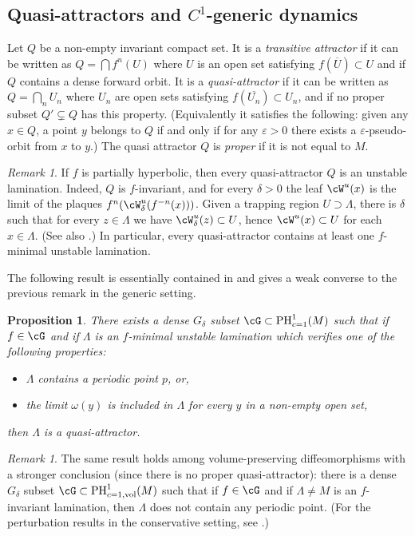 \documentclass[a4paper,11pt]{amsart}
\numberwithin{equation}{section}     %
\newtheorem{prop}[teo]{Proposition}
\theoremstyle{definition}
\theoremstyle{remark}
\newtheorem{obs}[teo]{Remark}
\begin{document}
\subsection{Quasi-attractors and $C^1$-generic dynamics}\label{ss.prelimgeneric}
Let $Q$ be a non-empty invariant compact set.
It is a \emph{transitive attractor} if it can be written as $Q= \bigcap f^n(U)$ where $U$ is an open set satisfying
$f(\overline U)\subset U$ and if $Q$ contains a dense forward orbit.
It is a \emph{quasi-attractor} if it can be written as
$Q= \bigcap_n U_n$ where $U_n$ are open sets satisfying $f(\overline{U_n}) \subset U_n$,
and if no proper subset $Q'\subsetneq Q$ has this property. (Equivalently it satisfies the following: given any $x\in Q$, a point $y$ belongs to $Q$ if and only if for any $\varepsilon>0$ there exists a $\varepsilon$-pseudo-orbit from $x$ to $y$.) The quasi attractor $Q$ is \emph{proper} if it is not equal to $M$.

\begin{obs} If $f$ is partially hyperbolic, then every quasi-attractor $Q$
is an unstable lamination.
Indeed, $Q$ is $f$-invariant, and for every $\delta>0$ the leaf $\cW^u(x)$ is the limit of the plaques $f^n(\cW^u_{\delta}(f^{-n}(x)))$. Given a trapping region $U \supset \Lambda$,
there is $\delta$ such that for every $z \in \Lambda$ we have $\cW^u_\delta(z) \subset U$, hence $\cW^u(x)\subset U$ for each $x\in \Lambda$. (See also \cite[Lemme 5.2]{BC-rec}.) In particular, every quasi-attractor contains at least one $f$-minimal unstable lamination. 
\end{obs}

The following result is essentially contained in \cite[\S{5}]{BC-rec} and gives a weak converse to the previous remark in the generic setting.

\begin{prop}\label{prop-QAgeneric}
There exists a dense $G_\delta$ subset $\cG \subset \mathrm{PH}^1_{c=1}(M)$ such that if $f \in \cG$ and if $\Lambda$ is an $f$-minimal unstable lamination which verifies one of the following properties:
\begin{itemize}
\item $\Lambda$ contains a periodic point $p$, or, 
\item the limit $\omega(y)$ is included in $\Lambda$ for every $y$ in a non-empty open set,
\end{itemize} \noindent then $\Lambda$ is a quasi-attractor.
\end{prop}
\begin{obs}
The same result holds among volume-preserving diffeomorphisms with a stronger conclusion (since there is no proper quasi-attractor): there is a dense $G_\delta$ subset $\cG \subset \mathrm{PH}^1_{c=1, \mathrm{vol}}(M)$ such that if $f \in \cG$ and if $\Lambda\neq M$ is an $f$-invariant lamination, then $\Lambda$ does not contain any periodic point. (For the perturbation results in the conservative setting, see \cite[\S 6]{BC-rec}.) 
\end{obs}
\end{document}
